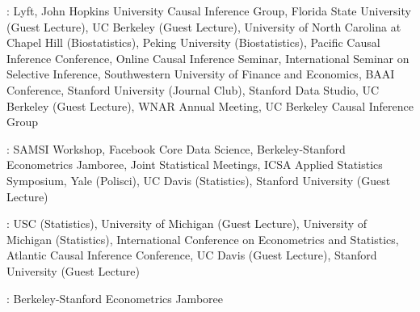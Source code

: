 \documentclass{article}
\begin{document}
\vspace{4mm}
:
Lyft, John Hopkins University Causal Inference Group, Florida State University (Guest Lecture), UC Berkeley (Guest Lecture), University of North Carolina at Chapel Hill (Biostatistics), Peking University (Biostatistics), Pacific Causal Inference Conference, Online Causal Inference Seminar, International Seminar on Selective Inference, Southwestern University of Finance and Economics, BAAI Conference, Stanford University (Journal Club), Stanford Data Studio, UC Berkeley (Guest Lecture), WNAR Annual Meeting, UC Berkeley Causal Inference Group

\vspace{4mm}
: SAMSI Workshop, Facebook Core Data Science, Berkeley-Stanford Econometrics Jamboree, Joint Statistical Meetings, ICSA Applied Statistics Symposium, Yale (Polisci), UC Davis (Statistics), Stanford University (Guest Lecture)

\vspace{4mm}
: USC (Statistics), University of Michigan (Guest Lecture), University of Michigan (Statistics), International Conference on Econometrics and Statistics, Atlantic Causal Inference Conference, UC Davis (Guest Lecture), Stanford University (Guest Lecture)

\vspace{4mm}
: Berkeley-Stanford Econometrics Jamboree
 







\end{document}
